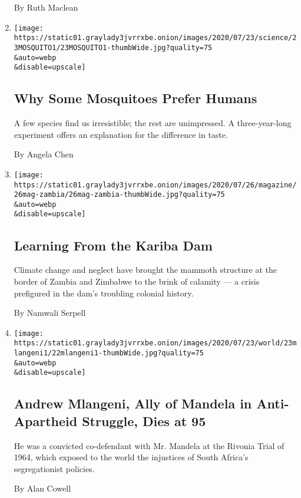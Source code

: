 \begin{enumerate}
  By Ruth Maclean
\item
  \href{/2020/07/23/science/mosquitoes-genetics-africa.html}{}

  \texttt{[image: https://static01.graylady3jvrrxbe.onion/images/2020/07/23/science/23MOSQUITO1/23MOSQUITO1-thumbWide.jpg?quality=75\\\&auto=webp\\\&disable=upscale]}

  \hypertarget{why-some-mosquitoes-prefer-humans}{%
  \subsection{Why Some Mosquitoes Prefer
  Humans}\label{why-some-mosquitoes-prefer-humans}}

  A few species find us irresistible; the rest are unimpressed. A
  three-year-long experiment offers an explanation for the difference in
  taste.

  By Angela Chen
\item
  \href{/interactive/2020/07/22/magazine/zambia-kariba-dam.html}{}

  \texttt{[image: https://static01.graylady3jvrrxbe.onion/images/2020/07/26/magazine/26mag-zambia/26mag-zambia-thumbWide.jpg?quality=75\\\&auto=webp\\\&disable=upscale]}

  \hypertarget{learning-from-the-kariba-dam}{%
  \subsection{Learning From the Kariba
  Dam}\label{learning-from-the-kariba-dam}}

  Climate change and neglect have brought the mammoth structure at the
  border of Zambia and Zimbabwe to the brink of calamity --- a crisis
  prefigured in the dam's troubling colonial history.

  By Namwali Serpell
\item
  \href{/2020/07/22/world/africa/andrew-mlangeni-dead.html}{}

  \texttt{[image: https://static01.graylady3jvrrxbe.onion/images/2020/07/23/world/23mlangeni1/22mlangeni1-thumbWide.jpg?quality=75\\\&auto=webp\\\&disable=upscale]}

  \hypertarget{andrew-mlangeni-ally-of-mandela-in-anti-apartheid-struggle-dies-at-95}{%
  \subsection{Andrew Mlangeni, Ally of Mandela in Anti-Apartheid
  Struggle, Dies at
  95}\label{andrew-mlangeni-ally-of-mandela-in-anti-apartheid-struggle-dies-at-95}}

  He was a convicted co-defendant with Mr. Mandela at the Rivonia Trial
  of 1964, which exposed to the world the injustices of South Africa's
  segregationist policies.

  By Alan Cowell
\end{enumerate}

